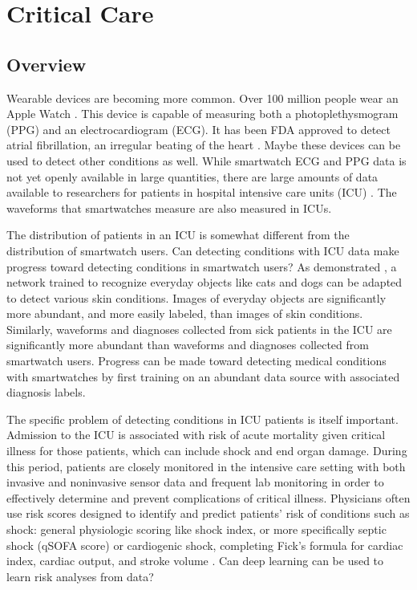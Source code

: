 \chapter{Critical Care}

\section{Overview}
Wearable devices are becoming more common.  Over 100 million people wear an Apple Watch \cite{cybart_2021}.  This device is capable of measuring both a photoplethysmogram (PPG) and an electrocardiogram (ECG).  It has been FDA approved to detect atrial fibrillation, an irregular beating of the heart \cite{perez2019large}.  Maybe these devices can be used to detect other conditions as well.  While smartwatch ECG and PPG data is not yet openly available in large quantities, there are large amounts of data available to researchers for patients in hospital intensive care units (ICU) \cite{johnson2016mimic}.  The waveforms that smartwatches measure are also measured in ICUs.

The distribution of patients in an ICU is somewhat different from the distribution of smartwatch users.  Can detecting conditions with ICU data make progress toward detecting conditions in smartwatch users?  As demonstrated \cite{kuprel2017dermatologist}, a network trained to recognize everyday objects like cats and dogs can be adapted to detect various skin conditions.  Images of everyday objects are significantly more abundant, and more easily labeled, than images of skin conditions.  Similarly, waveforms and diagnoses collected from sick patients in the ICU are significantly more abundant than waveforms and diagnoses collected from smartwatch users.  Progress can be made toward detecting medical conditions with smartwatches by first training on an abundant data source with associated diagnosis labels.  

The specific problem of detecting conditions in ICU patients is itself important.  Admission to the ICU is associated with risk of acute mortality given critical illness for those patients, which can include shock and end organ damage. During this period, patients are closely monitored in the intensive care setting with both invasive and noninvasive sensor data and frequent lab monitoring in order to effectively determine and prevent complications of critical illness.  Physicians often use risk scores designed to identify and predict patients’ risk of conditions such as shock: general physiologic scoring like shock index, or more specifically septic shock (qSOFA score) \cite{seymour2016assessment} or cardiogenic shock, completing Fick’s formula for cardiac index, cardiac output, and stroke volume \cite{fick1870ueber}.  Can deep learning can be used to learn risk analyses from data?


